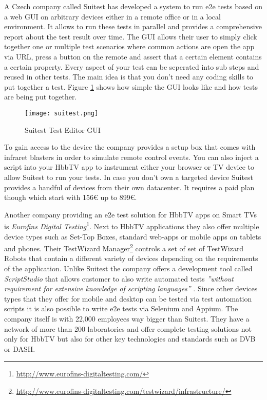 A Czech company called Suitest has developed a system to run e2e tests based on a web GUI on
arbitrary devices either in a remote office or in a local environment. It allows to run these
tests in parallel and provides a comprehensive report about the test result over time. The
GUI allows their user to simply click together one or multiple test scenarios where common
actions are open the app via URL, press a button on the remote and assert that a certain element
contains a certain property. Every aspect of your test can be seperated into sub steps and
reused in other tests. The main idea is that you don't need any coding skills to put together
a test. Figure \ref{fig:suitest} shows how simple the GUI looks like and how tests are being put
together.

\begin{figure}[htb]
  \centering
  \texttt{[image: suitest.png]}\\
  \caption{Suitest Test Editor GUI}\label{fig:suitest}
\end{figure}

To gain access to the device the company provides a setup box that comes with infraret blasters
in order to simulate remote control events. You can also inject a script into your HbbTV app
to instrument either your browser or TV device to allow Suitest to run your tests. In case
you don't own a targeted device Suitest provides a handful of devices from their own datacenter.
It requires a paid plan though which start with 156\euro{} up to 899\euro{}.

Another company providing an e2e test solution for HbbTV apps on Smart TVs is \textit{Eurofins Digital Testing}\footnote{\url{http://www.eurofins-digitaltesting.com/}}.
Next to HbbTV applications they also offer multiple device types such as Set-Top Boxes, standard
web-apps or mobile apps on tablets and phones. Their TestWizard Manager\footnote{\url{http://www.eurofins-digitaltesting.com/testwizard/infrastructure/}}
controls a set of set of TestWizard Robots that contain a different variety of devices depending
on the requirements of the application. Unlike Suitest the company offers a development tool
called \textit{ScriptStudio} that allows customer to also write automated tests \textit{''without
requirement for extensive knowledge of scripting languages''} \cite{scriptstudio}. Since other
devices types that they offer for mobile and desktop can be tested via test automation scripts
it is also possible to write e2e tests via Selenium and Appium. The company itself is with
22,000 employees way bigger than Suitest. They have a network of more than 200 laboratories and
offer complete testing solutions not only for HbbTV but also for other key technologies and standards
such as DVB or DASH.

